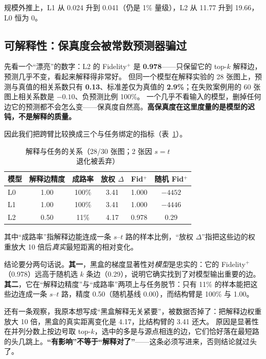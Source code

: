 规模外推上，L1 从 0.024 升到 0.041（仍是 1\% 量级），L2 从 11.77 升到 19.66，L0 恒为 0。

\subsection{可解释性：保真度会被常数预测器骗过}\label{sec:interp}

先看一个“漂亮”的数字：L2 的 Fidelity$^+$ 是 \textbf{0.978}——只保留它的 top-$k$ 解释边，预测几乎不变，看起来解释得非常好。
但同一个模型在解释实验的 28 张图上，预测与真值的相关系数只有 \textbf{0.13}、标准差仅为真值的 \textbf{2.9\%}；在失败案例用的 60 张图上相关系数是 $\mathbf{-0.10}$、负预测比例 100\%。
一个几乎不看输入的模型，删掉任何边它的预测都不会怎么变——保真度自然高。\textbf{高保真度在这里度量的是模型的迟钝，不是解释的质量。}

因此我们把跨臂比较换成三个与任务绑定的指标（表~\ref{tab:interp}）。

\begin{table}[H]
\centering
\caption{解释与任务的关系（28/30 张图；2 张因 $s=t$ 退化被丢弃）}
\label{tab:interp}
\small
\setlength{\tabcolsep}{4pt}
\begin{tabular}{lccccc}
\toprule
模型 & 解释边精度 & 成路率 & 放权 $\Delta$ & Fid$^+$ & 随机 Fid$^+$ \\
\midrule
L0 & 1.00 & 100\% & 3.41 & 1.000 & $-4452$ \\
L1 & 1.00 & 100\% & 3.41 & 1.000 & $-4446$ \\
L2 & 0.50 & 11\% & 4.17 & 0.978 & 0.29 \\
\bottomrule
\end{tabular}
\end{table}

其中“成路率”指解释边能连成一条 $s$--$t$ 路的样本比例，“放权 $\Delta$”指把这些边的权重放大 10 倍后\emph{真实}最短距离的相对变化。

结论要分两句话说。\textbf{其一}，黑盒的梯度显著性对\emph{模型}是忠实的：它的 Fidelity$^+$（0.978）远高于随机选 $k$ 条边（0.29），说明它确实找到了对模型输出重要的边。
\textbf{其二}，它在“解释边精度”与“成路率”两项上与任务脱节：只有 11\% 的样本能把这些边连成一条 $s$--$t$ 路，精度 0.50（随机基线 0.00），而结构臂是 100\% 与 1.00。

还有一条观察，我原本想写成“黑盒解释无关紧要”，被数据否掉了：把解释边权重放大 10 倍，黑盒的真实距离变化是 4.17，比结构臂的 3.41 还大。
原因是显著性在并列分数上按边号取 top-$k$，选中的多是与源点相连的边，它们恰好落在最短路的头几跳上。\textbf{“有影响”不等于“解释对了”}——这条必须写进来，否则结论就过头了。

